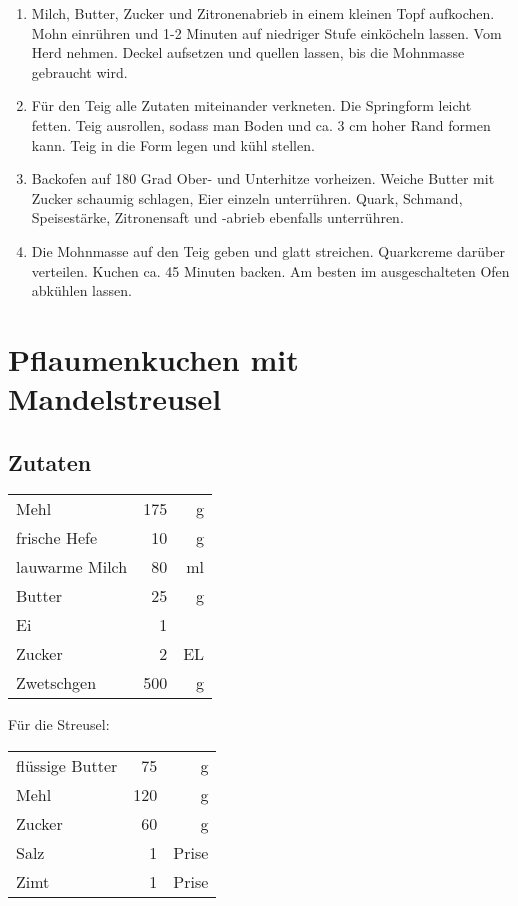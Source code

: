 \begin{enumerate}
    \item Milch, Butter, Zucker und Zitronenabrieb in einem kleinen Topf aufkochen. Mohn einrühren und 1-2 Minuten auf niedriger
    Stufe einköcheln lassen. Vom Herd nehmen. Deckel aufsetzen und quellen lassen, bis die Mohnmasse gebraucht wird.
    \item Für den Teig alle Zutaten miteinander verkneten. Die Springform leicht fetten. Teig ausrollen, sodass man Boden und ca. 3
    cm hoher Rand formen kann. Teig in die Form legen und kühl stellen.
    \item Backofen auf 180 Grad Ober- und Unterhitze vorheizen. Weiche Butter mit Zucker schaumig schlagen, Eier einzeln
    unterrühren. Quark, Schmand, Speisestärke, Zitronensaft und -abrieb ebenfalls unterrühren.
    \item Die Mohnmasse auf den Teig geben und glatt streichen. Quarkcreme darüber verteilen. Kuchen ca. 45 Minuten backen. Am
    besten im ausgeschalteten Ofen abkühlen lassen.
\end{enumerate}


\section{Pflaumenkuchen mit Mandelstreusel} 
\subsection*{Zutaten}

\begin{tabular}{lrr}
    Mehl           & 175 &  g \\
    frische Hefe   &  10 &  g \\
    lauwarme Milch &  80 & ml \\
    Butter         &  25 &  g \\
    Ei             &   1 &    \\
    Zucker         &   2 & EL \\
    Zwetschgen     & 500 &  g
\end{tabular} 

Für die Streusel:\\
\begin{tabular}{lrr}
    flüssige Butter &  75 &     g \\
    Mehl            & 120 &     g \\
    Zucker          &  60 &     g \\
    Salz            &   1 & Prise \\
    Zimt            &   1 & Prise
\end{tabular} 

